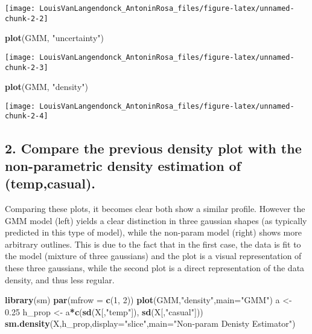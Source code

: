 \documentclass[
]{article}
\newenvironment{Shaded}{\begin{snugshade}}{\end{snugshade}}
\newcommand{\AttributeTok}[1]{\textcolor[rgb]{0.13,0.29,0.53}{#1}}
\newcommand{\DecValTok}[1]{\textcolor[rgb]{0.00,0.00,0.81}{#1}}
\newcommand{\FloatTok}[1]{\textcolor[rgb]{0.00,0.00,0.81}{#1}}
\newcommand{\FunctionTok}[1]{\textcolor[rgb]{0.13,0.29,0.53}{\textbf{#1}}}
\newcommand{\NormalTok}[1]{#1}
\newcommand{\OtherTok}[1]{\textcolor[rgb]{0.56,0.35,0.01}{#1}}
\newcommand{\SpecialCharTok}[1]{\textcolor[rgb]{0.81,0.36,0.00}{\textbf{#1}}}
\newcommand{\StringTok}[1]{\textcolor[rgb]{0.31,0.60,0.02}{#1}}
\begin{document}
\texttt{[image: LouisVanLangendonck\_AntoninRosa\_files/figure-latex/unnamed-chunk-2-2]}

\begin{Shaded}
\begin{Highlighting}[]
\FunctionTok{plot}\NormalTok{(GMM, }\StringTok{"uncertainty"}\NormalTok{)}
\end{Highlighting}
\end{Shaded}

\texttt{[image: LouisVanLangendonck\_AntoninRosa\_files/figure-latex/unnamed-chunk-2-3]}

\begin{Shaded}
\begin{Highlighting}[]
\FunctionTok{plot}\NormalTok{(GMM, }\StringTok{"density"}\NormalTok{)}
\end{Highlighting}
\end{Shaded}

\texttt{[image: LouisVanLangendonck\_AntoninRosa\_files/figure-latex/unnamed-chunk-2-4]}

\hypertarget{compare-the-previous-density-plot-with-the-non-parametric-density-estimation-of-tempcasual.}{%
\subsection{2. Compare the previous density plot with the non-parametric
density estimation of
(temp,casual).}\label{compare-the-previous-density-plot-with-the-non-parametric-density-estimation-of-tempcasual.}}

Comparing these plots, it becomes clear both show a similar profile.
However the GMM model (left) yields a clear distinction in three
gaussian shapes (as typically predicted in this type of model), while
the non-param model (right) shows more arbitrary outlines. This is due
to the fact that in the first case, the data is fit to the model
(mixture of three gaussians) and the plot is a visual representation of
these three gaussians, while the second plot is a direct representation
of the data density, and thus less regular.

\begin{Shaded}
\begin{Highlighting}[]
\FunctionTok{library}\NormalTok{(sm)}
\FunctionTok{par}\NormalTok{(}\AttributeTok{mfrow =} \FunctionTok{c}\NormalTok{(}\DecValTok{1}\NormalTok{, }\DecValTok{2}\NormalTok{))}
\FunctionTok{plot}\NormalTok{(GMM,}\StringTok{"density"}\NormalTok{,}\AttributeTok{main=}\StringTok{"GMM"}\NormalTok{)}
\NormalTok{a }\OtherTok{\textless{}{-}} \FloatTok{0.25}
\NormalTok{h\_prop }\OtherTok{\textless{}{-}}\NormalTok{ a}\SpecialCharTok{*}\FunctionTok{c}\NormalTok{(}\FunctionTok{sd}\NormalTok{(X[,}\StringTok{"temp"}\NormalTok{]), }\FunctionTok{sd}\NormalTok{(X[,}\StringTok{"casual"}\NormalTok{]))}
\FunctionTok{sm.density}\NormalTok{(X,h\_prop,}\AttributeTok{display=}\StringTok{"slice"}\NormalTok{,}\AttributeTok{main=}\StringTok{"Non{-}param Denisty Estimator"}\NormalTok{)}
\end{Highlighting}
\end{Shaded}
\end{document}
